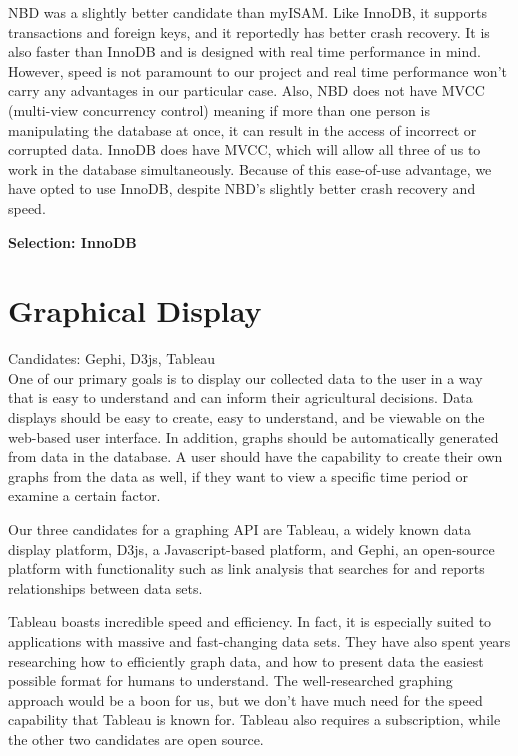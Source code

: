 \documentclass[letterpaper,10pt,titlepage]{article}
\begin{document}
NBD was a slightly better candidate than myISAM. Like InnoDB, it supports transactions and foreign keys, and it reportedly has better crash recovery. It is also faster than InnoDB and is designed with real time performance in mind. However, speed is not paramount to our project and real time performance won’t carry any advantages in our particular case. Also, NBD does not have MVCC (multi-view concurrency control) meaning if more than one person is manipulating the database at once, it can result in the access of incorrect or corrupted data. InnoDB does have MVCC, which will allow all three of us to work in the database simultaneously. Because of this ease-of-use advantage, we have opted to use InnoDB, despite NBD's slightly better crash recovery and speed.\cite{Wikipedia}

\textbf{Selection: InnoDB}

\section{Graphical Display}

\normalsize Candidates: Gephi, D3js, Tableau
\\

\small One of our primary goals is to display our collected data to the user in a way that is easy to understand and can inform their agricultural decisions. Data displays should be easy to create, easy to understand, and be viewable on the web-based user interface. In addition, graphs should be automatically generated from data in the database. A user should have the capability to create their own graphs from the data as well, if they want to view a specific time period or examine a certain factor. 

Our three candidates for a graphing API are Tableau, a widely known data display platform, D3js, a Javascript-based platform, and Gephi, an open-source platform with functionality such as link analysis that searches for and reports relationships between data sets. 

Tableau boasts incredible speed and efficiency. In fact, it is especially suited to applications with massive and fast-changing data sets. They have also spent years researching how to efficiently graph data, and how to present data the easiest possible format for humans to understand. The well-researched graphing approach would be a boon for us, but we don’t have much need for the speed capability that Tableau is known for. Tableau also requires a subscription, while the other two candidates are open source.\cite{B. Sullins}
\end{document}
